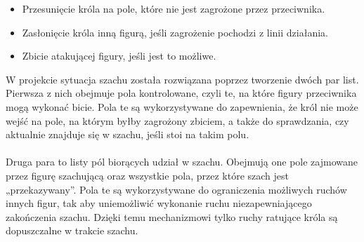 \documentclass[twoside]{projektInzynierskiMS1}
\begin{document}
\begin{itemize}
    \item Przesunięcie króla na pole, które nie jest zagrożone przez przeciwnika.
    \item Zasłonięcie króla inną figurą, jeśli zagrożenie pochodzi z linii działania.
    \item Zbicie atakującej figury, jeśli jest to możliwe.
\end{itemize}

\noindent
W projekcie sytuacja szachu została rozwiązana poprzez tworzenie dwóch par list. Pierwsza z nich obejmuje pola kontrolowane, czyli te, na które figury przeciwnika mogą wykonać bicie. Pola te są wykorzystywane do zapewnienia, że król nie może wejść na pole, na którym byłby zagrożony zbiciem, a także do sprawdzania, czy aktualnie znajduje się w szachu, jeśli stoi na takim polu.
\\\\
Druga para to listy pól biorących udział w szachu. Obejmują one pole zajmowane przez figurę szachującą oraz wszystkie pola, przez które szach jest „przekazywany”. Pola te są wykorzystywane do ograniczenia możliwych ruchów innych figur, tak aby uniemożliwić wykonanie ruchu niezapewniającego zakończenia szachu. Dzięki temu mechanizmowi tylko ruchy ratujące króla są dopuszczalne w trakcie szachu.
\end{document}

